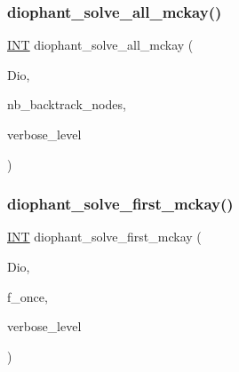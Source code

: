 \subsubsection{\texorpdfstring{diophant\+\_\+solve\+\_\+all\+\_\+mckay()}{diophant\_solve\_all\_mckay()}}
{\footnotesize\ttfamily \mbox{\hyperlink{galois_8h_a09fddde158a3a20bd2dcadb609de11dc}{I\+NT}} diophant\+\_\+solve\+\_\+all\+\_\+mckay (\begin{DoxyParamCaption}\item[{\mbox{\hyperlink{classdiophant}{diophant}} $\ast$}]{Dio,  }\item[{\mbox{\hyperlink{galois_8h_a09fddde158a3a20bd2dcadb609de11dc}{I\+NT}} \&}]{nb\+\_\+backtrack\+\_\+nodes,  }\item[{\mbox{\hyperlink{galois_8h_a09fddde158a3a20bd2dcadb609de11dc}{I\+NT}}}]{verbose\+\_\+level }\end{DoxyParamCaption})}

\mbox{\label{incidence__global_8_c_ac03e1a3fc0816caf0b6114281b46e142}} 
\subsubsection{\texorpdfstring{diophant\+\_\+solve\+\_\+first\+\_\+mckay()}{diophant\_solve\_first\_mckay()}}
{\footnotesize\ttfamily \mbox{\hyperlink{galois_8h_a09fddde158a3a20bd2dcadb609de11dc}{I\+NT}} diophant\+\_\+solve\+\_\+first\+\_\+mckay (\begin{DoxyParamCaption}\item[{\mbox{\hyperlink{classdiophant}{diophant}} $\ast$}]{Dio,  }\item[{\mbox{\hyperlink{galois_8h_a09fddde158a3a20bd2dcadb609de11dc}{I\+NT}}}]{f\+\_\+once,  }\item[{\mbox{\hyperlink{galois_8h_a09fddde158a3a20bd2dcadb609de11dc}{I\+NT}}}]{verbose\+\_\+level }\end{DoxyParamCaption})}

\mbox{\label{incidence__global_8_c_a13197239f146dbec9e369244a28e6fb5}} 
